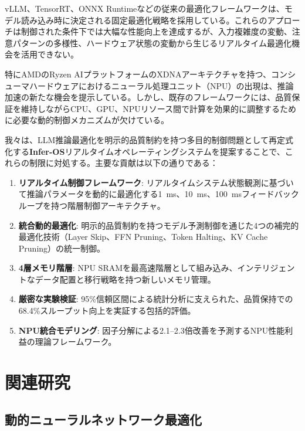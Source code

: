 \documentclass[10pt,twocolumn,a4paper]{jarticle}
\begin{document}
vLLM、TensorRT、ONNX Runtimeなどの従来の最適化フレームワークは、モデル読み込み時に決定される固定最適化戦略を採用している。これらのアプローチは制御された条件下では大幅な性能向上を達成するが、入力複雑度の変動、注意パターンの多様性、ハードウェア状態の変動から生じるリアルタイム最適化機会を活用できない。

特にAMDのRyzen AIプラットフォームのXDNAアーキテクチャを持つ、コンシューマハードウェアにおけるニューラル処理ユニット（NPU）の出現は、推論加速の新たな機会を提示している。しかし、既存のフレームワークには、品質保証を維持しながらCPU、GPU、NPUリソース間で計算を効果的に調整するために必要な動的制御メカニズムが欠けている。

我々は、LLM推論最適化を明示的品質制約を持つ多目的制御問題として再定式化する\textbf{Infer-OS}リアルタイムオペレーティングシステムを提案することで、これらの制限に対処する。主要な貢献は以下の通りである：

\begin{enumerate}
\item \textbf{リアルタイム制御フレームワーク}: リアルタイムシステム状態観測に基づいて推論パラメータを動的に最適化する\SI{1}{ms}、\SI{10}{ms}、\SI{100}{ms}フィードバックループを持つ階層制御アーキテクチャ。

\item \textbf{統合動的最適化}: 明示的品質制約を持つモデル予測制御を通じた4つの補完的最適化技術（Layer Skip、FFN Pruning、Token Halting、KV Cache Pruning）の統一制御。

\item \textbf{4層メモリ階層}: NPU SRAMを最高速階層として組み込み、インテリジェントなデータ配置と移行戦略を持つ新しいメモリ管理。

\item \textbf{厳密な実験検証}: 95\%信頼区間による統計分析に支えられた、品質保持での68.4\%スループット向上を実証する包括的評価。

\item \textbf{NPU統合モデリング}: 因子分解による2.1--2.3倍改善を予測するNPU性能利益の理論フレームワーク。
\end{enumerate}

\section{関連研究}

\subsection{動的ニューラルネットワーク最適化}
\end{document}
